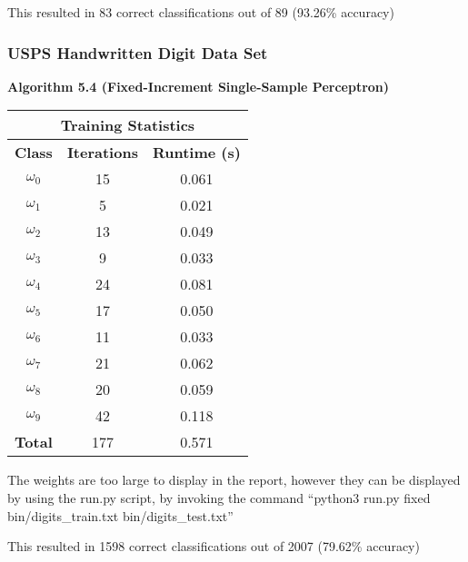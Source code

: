 \documentclass{article}
\newcommand{\result}[1]{\subsubsection*{#1}}
\newcommand{\fakesection}[1]{{\bf #1}\par}
\begin{document}
This resulted in 83 correct classifications out of 89 (93.26\% accuracy)

\result{USPS Handwritten Digit Data Set}

\begin{center}
\fakesection{Algorithm 5.4 (Fixed-Increment Single-Sample Perceptron)}
\begin{tabular}{|c|c|c|}
\multicolumn{3}{c}{{\bf Training Statistics}}\\
\hline{\bf Class} & {\bf Iterations} & {\bf Runtime (s)}\\
\hline
$\omega_0$ & 15 & 0.061 \\
$\omega_1$ & 5 & 0.021 \\
$\omega_2$ & 13 & 0.049 \\
$\omega_3$ & 9 & 0.033 \\
$\omega_4$ & 24 & 0.081 \\
$\omega_5$ & 17 & 0.050 \\
$\omega_6$ & 11 & 0.033 \\
$\omega_7$ & 21 &  0.062 \\
$\omega_8$ & 20 & 0.059 \\
$\omega_9$ & 42 & 0.118 \\
\hline
{\bf Total} & 177 & 0.571\\
\hline
\end{tabular}
\end{center}

The weights are too large to display in the report, however they can be displayed by using the run.py script, by invoking the command ``python3 run.py fixed bin/digits\_train.txt bin/digits\_test.txt''

\bigskip

This resulted in 1598 correct classifications out of 2007 (79.62\% accuracy)
\end{document}
